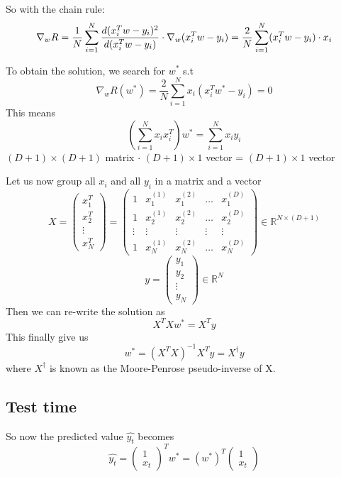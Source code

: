 So with the chain rule:\\
\[
  \nabla_wR = \frac{1}{N}\sum_{i=1}^{N}\frac{d(x_i^Tw - y_i)^2}{d(x_i^Tw - y_i)} \cdot  \nabla_w(x_i^Tw - y_i) \\
= \frac{2}{N}\sum_{i=1}^{N}(x_i^Tw - y_i) \cdot x_i
\]

To obtain the solution, we search for $w^*$ s.t 
\[
  \nabla_wR(w^*) = \frac{2}{N}\sum_{i=1}^{N}x_i(x_i^Tw^* - y_i) = 0
\]
This means 
\[
  (\sum_{i=1}^{N}x_ix_i^T)w^* = \sum_{i=1}^{N}x_iy_i
\]
$(D+1) \times (D+1)$ matrix $\cdot $ $(D+1) \times 1$ vector = $(D+1) \times 1$ vector

Let us now group all ${x_i}$ and all ${y_i}$ in a matrix and a vector
\[
X = \begin{pmatrix} x_1^T \\ x_2^T \\ \vdots \\ x_N^T \end{pmatrix} = \begin{pmatrix} 1 & x_1^{(1)}& x_1^{(2)}& \dots & x_1^{(D)} \\ 1 & x_2^{(1)}& x_2^{(2)}& \dots & x_2^{(D)} \\ \vdots & \vdots & \vdots & \vdots & \vdots \\ 1 & x_N^{(1)}& x_N^{(2)}& \dots & x_N^{(D)}\end{pmatrix} \in \mathbb{R}^{N \times (D+1)}
\]
\[
  y = \begin{pmatrix} y_1 \\ y_2 \\ \vdots \\ y_N\end{pmatrix} \in \mathbb{R}^N
\]
Then we can re-write the solution as 
\[
  X^TXw^* = X^Ty
\]
This finally give us \[
  w^* = (X^TX)^{-1}X^Ty = X^\dagger y
\]
where $X^\dagger$ is known as the Moore-Penrose pseudo-inverse of X.

\subsection{Test time}
So now the predicted value $\hat{y_t}$ becomes 
\[
\hat{y_t} = \begin{pmatrix} 1\\x_t \end{pmatrix} ^T w^* = (w^*)^T\begin{pmatrix} 1\\ x_t\end{pmatrix}
\]


